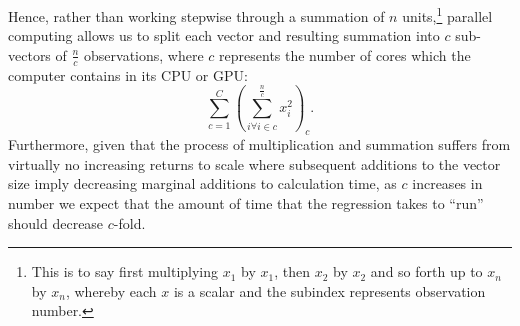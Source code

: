 \documentclass{article}[11pt,subeqn]
\begin{document}
\begin{spacing}{1.25}
Hence, rather than working stepwise through a summation of $n$ units,\footnote{This is to say first multiplying $x_1$ by $x_1$, then $x_2$
by $x_2$ and so forth up to $x_n$ by $x_n$, whereby each $x$ is a scalar and the subindex represents observation number.} parallel computing allows 
us to split each vector and resulting summation into $c$ sub-vectors of $\frac{n}{c}$ observations, where $c$ represents the number of cores which 
the computer contains in its CPU or GPU:
\begin{equation}
\label{eqn:parallelised}
\sum_{c=1}^C\left(\sum_{i\forall i\in c}^{\frac{n}{c}}x^2_i\right)_c.
\end{equation}
Furthermore, given that the process of multiplication and summation suffers from virtually no increasing returns to scale where subsequent
additions to the vector size imply decreasing marginal additions to calculation time, as $c$ increases in number we expect that the amount of time that
the regression takes to ``run'' should decrease $c$-fold. 


\end{spacing}
\end{document}

